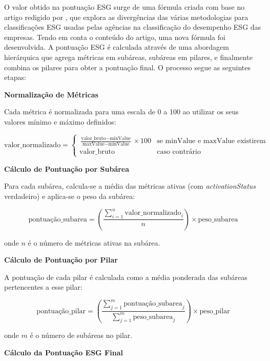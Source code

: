 O valor obtido na pontuação ESG surge de uma fórmula criada com base no artigo redigido por \cite{Berg2022}, que explora as divergências das várias metodologias para classificações ESG usadas pelas agências na classificação do desempenho ESG das empresas. Tendo em conta o conteúdo do artigo, uma nova fórmula foi desenvolvida. A pontuação ESG é calculada através de uma abordagem hierárquica que agrega métricas em subáreas, subáreas em pilares, e finalmente combina os pilares para obter a pontuação final. O processo segue as seguintes etapas:

\textbf{Normalização de Métricas}

Cada métrica é normalizada para uma escala de 0 a 100 ao utilizar os seus valores mínimo e máximo definidos:

\begin{equation}
    \text{valor\_normalizado} = \begin{cases}
        \frac{\text{valor\_bruto} - \text{minValue}}{\text{maxValue} - \text{minValue}} \times 100 & \text{se minValue e maxValue existirem} \\
        \text{valor\_bruto} & \text{caso contrário}
    \end{cases}
\end{equation}

\textbf{Cálculo de Pontuação por Subárea}

Para cada subárea, calcula-se a média das métricas ativas (com \textit{activationStatus} verdadeiro) e aplica-se o peso da subárea:

\begin{equation}
    \text{pontuação\_subarea} = \left( \frac{\sum_{i=1}^{n} \text{valor\_normalizado}_i}{n} \right) \times \text{peso\_subarea}
\end{equation}

onde $n$ é o número de métricas ativas na subárea.

\textbf{Cálculo de Pontuação por Pilar}

A pontuação de cada pilar é calculada como a média ponderada das subáreas pertencentes a esse pilar:

\begin{equation}
    \text{pontuação\_pilar} = \left( \frac{\sum_{j=1}^{m} \text{pontuação\_subarea}_j}{\sum_{j=1}^{m} \text{peso\_subarea}_j} \right) \times \text{peso\_pilar}
\end{equation}

onde $m$ é o número de subáreas no pilar.

\textbf{Cálculo da Pontuação ESG Final}

